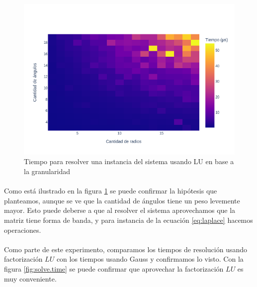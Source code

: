 \documentclass[12pt]{article}
\begin{document}
\begin{figure}[H]
	\centering
	\includegraphics[scale=0.5]{simple.1.granularity.heatmap}
	\caption{Tiempo para resolver una instancia del sistema usando LU en base a la granularidad}
	\label{fig:granularity.heatmap}
\end{figure}

\paragraph{} Como está ilustrado en la figura \ref{fig:granularity.heatmap} se puede confirmar la hipótesis que planteamos, aunque se ve que la cantidad de ángulos tiene un peso levemente mayor. Esto puede deberse a que al resolver el sistema aprovechamos que la matriz tiene forma de banda, y para instancia de la ecuación \ref{eq:laplace} hacemos  operaciones.

\paragraph{} Como parte de este experimento, comparamos los tiempos de resolución usando factorización \(LU\) con los tiempos usando Gauss y confirmamos lo visto. Con la figura \ref{fig:solve.time} se puede confirmar que aprovechar la factorización \(LU\) es muy conveniente.
\end{document}
